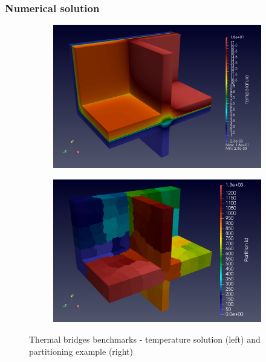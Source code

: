 

\subsubsection{Numerical solution}



\begin{figure}[!ht]
  \centering
  \begin{subfigure}[c]{0.49\textwidth}
    \centering
    \includegraphics[width=\textwidth]{graphics/feelpp/feelpp-benchmark-thermalbridges-solution.png}
  \end{subfigure}
  \hfill
  \begin{subfigure}[c]{0.49\textwidth}
    \centering
    \includegraphics[width=\textwidth]{graphics/feelpp/feelpp-benchmark-thermalbridges-pid.png}
  \end{subfigure}
  \caption{Thermal bridges benchmarks - temperature solution (left) and
    partitioning example (right)}
  \label{fig:spec:app-feelpp-discr-1:thermal_bridges:visualization}
\end{figure}


